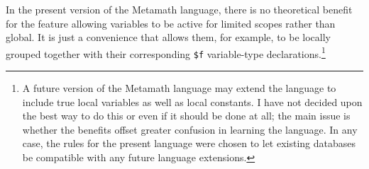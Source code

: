In the present version of the Metamath language, there is no theoretical
benefit for the feature allowing variables to be active for limited scopes
rather than global. It is just a convenience that allows them, for example, to
be locally grouped together with their corresponding \texttt{\$f} variable-type
declarations.\footnote{A future version\label{redeclarationf} of the Metamath
language may extend the language to include true local variables as well as
local constants.  I have not decided upon the best way to do this or even if
it should be done at all; the main issue is whether the benefits offset
greater confusion in learning the language.  In any case, the rules for
the present language were chosen to let existing databases be compatible with
any future language extensions.}


